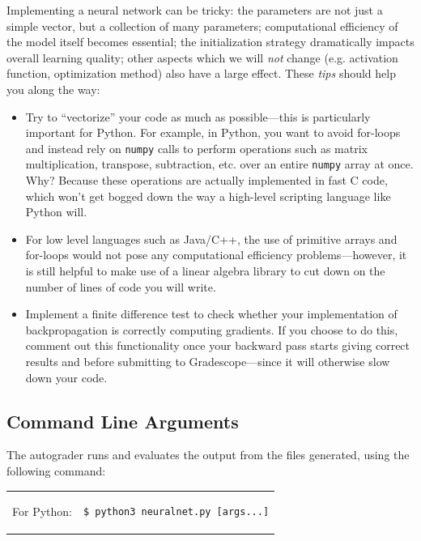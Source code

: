 \documentclass[11pt,addpoints,answers]{exam}
\begin{document}
Implementing a neural network can be tricky: the parameters are not just a simple vector, but a collection of many parameters; computational efficiency of the model itself becomes essential; the initialization strategy dramatically impacts overall learning quality;  other aspects which we will \emph{not} change (e.g. activation function, optimization method) also have a large effect. These \emph{tips} should help you along the way:

\begin{itemize}
\item Try to ``vectorize'' your code as much as possible---this is particularly important for Python. For example, in Python, you want to avoid for-loops and instead rely on \lstinline{numpy} calls to perform operations such as matrix multiplication, transpose, subtraction, etc. over an entire \lstinline{numpy} array at once. Why? Because these operations are actually implemented in fast C code, which won't get bogged down the way a high-level scripting language like Python will.
\item For low level languages such as Java/C++, the use of primitive arrays and for-loops would not pose any computational efficiency problems---however, it is still helpful to make use of a linear algebra library to cut down on the number of lines of code you will write.
\item Implement a finite difference test to check whether your implementation of backpropagation is correctly computing gradients. If you choose to do this, comment out this functionality once your backward pass starts giving correct results and before submitting to Gradescope---since it will otherwise slow down your code.
\end{itemize}

\subsection{Command Line Arguments}
\label{sec:args}
The autograder runs and evaluates the output from the files generated, using the following command:

\begin{tabular}{ll}
For Python: &
\begin{lstlisting}[language=Shell]
$ python3 neuralnet.py [args...]
\end{lstlisting}
\\
For Java: &
\begin{lstlisting}[language=Shell]
$ javac -cp "./lib/ejml-v0.38-libs/*:./" neuralnet.java
$ java -cp "./lib/ejml-v0.38-libs/*:./" neuralnet [args...]
\end{lstlisting}
\\
For C++: &
\begin{lstlisting}[language=Shell]
$ g++ -g -std=c++11 -I./lib neuralnet.cpp; ./a.out [args...]
\end{lstlisting}
\end{tabular}
\end{document}
